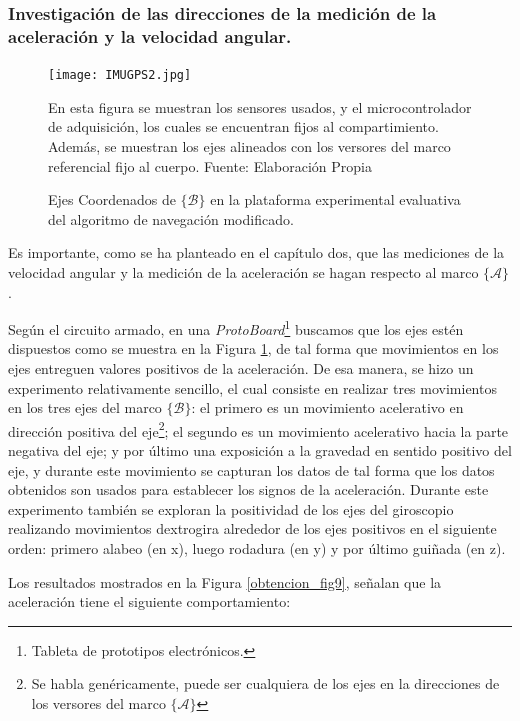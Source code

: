 \documentclass[10pt]{report}
\numberwithin{equation}{chapter}
\numberwithin{algorithm}{chapter}
\newcommand{\marco}[1]{\{\mathcal{#1}\}}
\begin{document}
\subsubsection{Investigación de las direcciones de la medición de la aceleración y la velocidad angular.}
\begin{figure}[t]
\begin{center}
\texttt{[image: IMUGPS2.jpg]}
\caption{Ejes Coordenados de $\marco{B}$ en la plataforma experimental evaluativa del algoritmo de navegación modificado.}
\label{IMUGPS_fig6}
\end{center}
\scriptsize{En esta figura se muestran los sensores usados, y el microcontrolador de adquisición, los cuales se encuentran fijos al compartimiento. Además, se muestran los ejes alineados con los versores del marco referencial fijo al cuerpo. Fuente: Elaboración Propia}
\end{figure}
Es importante, como se ha planteado en el capítulo dos, que las mediciones de la velocidad angular y la medición de la aceleración se hagan respecto al marco $\marco{A}$.\par
Según el circuito armado, en una \emph{ProtoBoard}\footnote{Tableta de prototipos electrónicos.} buscamos que los ejes estén dispuestos como se muestra en la Figura \ref{IMUGPS_fig6}, de tal forma que movimientos en los ejes entreguen valores positivos de la aceleración. De esa manera, se hizo un experimento relativamente sencillo, el cual consiste en realizar tres movimientos en los tres ejes del marco $\marco{B}$: el primero es un movimiento acelerativo en dirección positiva del eje\footnote{Se habla genéricamente, puede ser cualquiera de los ejes en la direcciones de los versores del marco $\marco{A}$}; el segundo es un movimiento acelerativo hacia la parte negativa del eje; y por último una exposición a la gravedad en sentido positivo del eje, y durante este movimiento se capturan los datos de tal forma que los datos obtenidos son usados para establecer los signos de la aceleración. Durante este experimento también se exploran la positividad de los ejes del giroscopio realizando movimientos dextrogira alrededor de los ejes positivos en el siguiente orden: primero alabeo (en x), luego rodadura (en y) y por último guiñada (en z).\par
Los resultados mostrados en la Figura \ref{obtencion_fig9}, señalan que la aceleración tiene el siguiente comportamiento:
\end{document}

